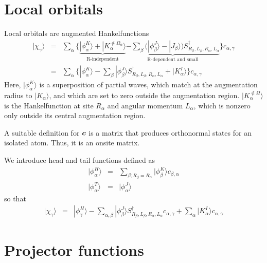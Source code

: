 \documentclass[11pt,a4paper]{report}
\begin{document}
\section{Local orbitals}
Local orbitals are augmented Hankelfunctions
\begin{eqnarray}
|\chi_\gamma\rangle&=&
\sum_\alpha \biggl\lbrace
\underbrace{
|\phi^{K}_{\alpha}\rangle+ |K^{\notin\Omega_\alpha}_\alpha\rangle
}_{\text{R-independent}}
\underbrace{
-\sum_{\beta}
\biggl(|\phi^J_{\beta}\rangle -|J_{\beta}\rangle\biggr)
S^\dagger_{R_\beta,L_\beta,R_\alpha,L_\alpha}}_{\text{R-dependent and small}}
\biggr\rbrace c_{\alpha,\gamma}
\nonumber\\
&=&\sum_\alpha \biggl\lbrace
|\phi^{K}_{\alpha}\rangle
-\sum_{\beta}
|\phi^J_{\beta}\rangle S^\dagger_{R_\beta,L_\beta,R_\alpha,L_\alpha}
+ |K^{I}_\alpha\rangle
\biggr\rbrace c_{\alpha,\gamma}
\end{eqnarray}
Here, $|\phi^K_\alpha\rangle$ is a superposition of partial waves,
which match at the augmentation radius to $|K_\alpha\rangle$, and
which are set to zero outside the augmentation region.
$|K^{\notin\Omega}_\alpha\rangle$ is the Hankelfunction at site
$R_\alpha$ and angular momentum $L_\alpha$, which is nonzero only
outside its central augmentation region.

A suitable definition for $\bm{c}$ is a matrix that produces
orthonormal states for an isolated atom. Thus, it is an onsite matrix.

We introduce head and tail functions defined as
\begin{eqnarray}
|\phi^H_\alpha\rangle&=&\sum_{\beta; R_\beta=R_\alpha}
|\phi^K_\beta\rangle c_{\beta,\alpha}
\nonumber\\
|\phi^T_\alpha\rangle&=&|\phi^J_\alpha\rangle
\end{eqnarray}
so that
\begin{eqnarray}
|\chi_\gamma\rangle&=&
|\phi^{H}_{\gamma}\rangle
-\sum_{\alpha,\beta}
|\phi^J_{\beta}\rangle S^\dagger_{R_\beta,L_\beta,R_\alpha,L_\alpha}
c_{\alpha,\gamma}
+\sum_\alpha |K^{I}_\alpha\rangle c_{\alpha,\gamma}
\end{eqnarray}






\section{Projector functions}
\end{document}

